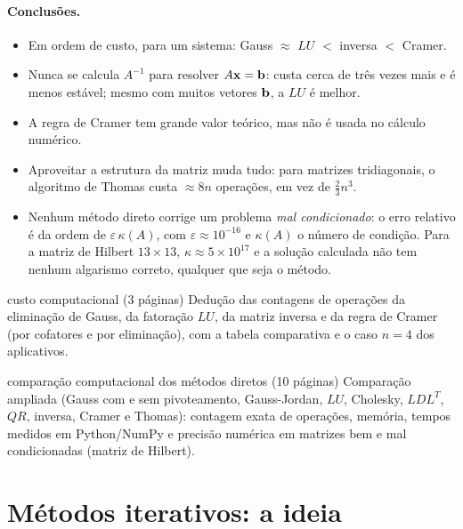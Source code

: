 \paragraph{Conclusões.}
\begin{itemize}[nosep]
  \item Em ordem de custo, para um sistema: Gauss $\approx$ $LU$ $<$ inversa $<$ Cramer.
  \item Nunca se calcula $A^{-1}$ para resolver $A\mathbf{x}=\mathbf{b}$: custa cerca de três vezes mais e é
        menos estável; mesmo com muitos vetores $\mathbf{b}$, a $LU$ é melhor.
  \item A regra de Cramer tem grande valor teórico, mas não é usada no cálculo numérico.
  \item Aproveitar a estrutura da matriz muda tudo: para matrizes tridiagonais, o algoritmo de
        Thomas custa $\approx8n$ operações, em vez de $\frac23n^3$.
  \item Nenhum método direto corrige um problema \emph{mal condicionado}: o erro relativo é da
        ordem de $\varepsilon\,\kappa(A)$, com $\varepsilon\approx10^{-16}$ e $\kappa(A)$ o número
        de condição. Para a matriz de Hilbert $13\times13$, $\kappa\approx5\times10^{17}$ e a
        solução calculada não tem nenhum algarismo correto, qualquer que seja o método.
\end{itemize}

\begin{leitura}{custo computacional (3 páginas)}{\pdfCusto}
Dedução das contagens de operações da eliminação de Gauss, da fatoração $LU$, da matriz
inversa e da regra de Cramer (por cofatores e por eliminação), com a tabela comparativa e o
caso $n=4$ dos aplicativos.
\end{leitura}

\begin{leitura}{comparação computacional dos métodos diretos (10 páginas)}{\pdfComp}
Comparação ampliada (Gauss com e sem pivoteamento, Gauss-Jordan, $LU$, Cholesky, $LDL^T$,
$QR$, inversa, Cramer e Thomas): contagem exata de operações, memória, tempos medidos em
Python/NumPy e precisão numérica em matrizes bem e mal condicionadas (matriz de Hilbert).
\end{leitura}

\section{Métodos iterativos: a ideia}

